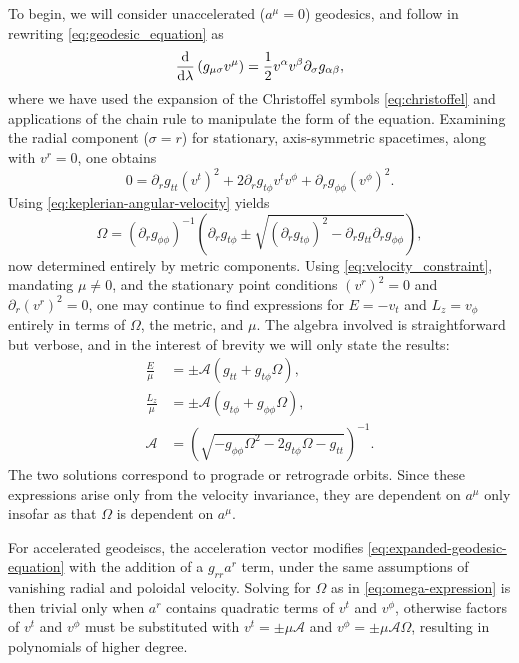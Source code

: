 To begin, we will consider unaccelerated ($a^\mu = 0$) geodesics, and follow
\cite{johannsen_regular_2013} in rewriting \eqref{eq:geodesic_equation} as
\begin{equation}
    \frac{\text{d}}{\text{d} \lambda}\left( g_{\mu\sigma}v^\mu \right) = \frac{1}{2} v^\alpha v^\beta \partial_\sigma g_{\alpha \beta},
\end{equation}
where we have used the expansion of the Christoffel symbols
\eqref{eq:christoffel} and applications of the chain rule to manipulate the
form of the equation. Examining the radial component ($\sigma = r$) for
stationary, axis-symmetric spacetimes, along with $v^r = 0$, one obtains
\begin{equation}
    \label{eq:expanded-geodesic-equation}
    0 =
    \partial_r g_{tt} (v^t)^2
    + 2\partial_r g_{t\phi} v^t v^\phi
    + \partial_r g_{\phi\phi} (v^\phi)^2.
\end{equation}
Using \eqref{eq:keplerian-angular-velocity} yields
\begin{equation}
    \label{eq:omega-expression}
    \Omega =
    \left( \partial_r g_{\phi\phi} \right)^{-1}\left( \partial_r g_{t\phi} \pm \sqrt{\left( \partial_r g_{t\phi} \right)^2 - \partial_r g_{tt} \partial_r g_{\phi\phi}} \right),
\end{equation}
now determined entirely by metric components. Using
\eqref{eq:velocity_constraint}, mandating $\mu \neq 0$, and the stationary
point conditions $(v^r)^2 = 0$ and $\partial_r (v^r)^2 = 0$, one may continue
to find expressions for $E = -v_t$ and $L_z = v_\phi$ entirely in terms of
$\Omega$, the metric, and $\mu$. The algebra involved is straightforward but
verbose, and in the interest of brevity we will only state the results:
\begin{align}
    \frac{E}{\mu} &= \pm \mathcal{A} \left(g_{tt} + g_{t\phi}\Omega\right) , \label{eq:energy-of-orbit} \\
    \frac{L_z}{\mu} &= \pm \mathcal{A} \left(g_{t\phi} + g_{\phi\phi}\Omega\right), \\
    \mathcal{A} &= \left(\sqrt{-g_{\phi\phi} \Omega^2 - 2g_{t\phi} \Omega - g_{tt}}\right)^{-1}.
\end{align}
The two solutions correspond to prograde or retrograde orbits. Since these
expressions arise only from the velocity invariance, they are dependent on
$a^\mu$ only insofar as that $\Omega$ is dependent on $a^\mu$.

For accelerated geodeiscs, the acceleration vector modifies
\eqref{eq:expanded-geodesic-equation} with the addition of a $g_{rr} a^r$ term,
under the same assumptions of vanishing radial and poloidal velocity. Solving
for $\Omega$ as in \eqref{eq:omega-expression} is then trivial only when $a^r$
contains quadratic terms of $v^t$ and $v^\phi$, otherwise factors of $v^t$ and
$v^\phi$ must be substituted with $v^t = \pm \mu \mathcal{A}$ and $v^\phi = \pm
\mu \mathcal{A} \Omega$, resulting in polynomials of higher degree.

